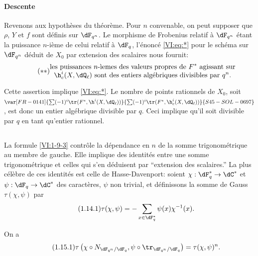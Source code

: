 \paragraph{Descente}
Revenons aux hypothèses du théorème. Pour $n$ convenable, on peut 
supposer que $\rho$, $Y$ et $f$ sont définis sur $\dF_{q^n}$. Le morphisme de 
Frobenius relatif à $\dF_{q^n}$ étant la puissance $n$-ième de celui 
relatif à $\dF_q$, l'énoncé \eqref{VI:eq:*} pour le schéma sur 
$\dF_{q^n}$ déduit de $X_0$ par extension des scalaires nous fournit: 
\begin{equation*}\tag{$**$}\label{VI:eq:**}
  \substack{\displaystyle\text{les puissances $n$-\`iemes des valeurs propres de $F^\ast$ agissant sur} \\ \displaystyle\text{$\h_c^i(X,\dQ_\ell)$ sont des entiers algébriques divisibles par $q^n$.}}
\end{equation*}

Cette assertion implique \eqref{VI:eq:*}. Le nombre de points rationnels de 
$X_0$, soit $\var[FR-0141]{\sum (-1)^i \tr(F^\ast,\h^i(X,\dQ_\ell))}{\sum (-1)^i \tr(F^\ast,\h_c^i(X,\dQ_\ell))}{S45-SOL-0697}$, est donc un entier 
algébrique divisible par $q$. Ceci implique qu'il soit divisible par $q$ en 
tant qu'entier rationnel. 






\subsection{}\label{VI:1-14}

La formule \ref{VI:1-9-3} contrôle la dépendance en $n$ de la somme 
trigonométrique au membre de gauche. Elle implique des identités entre une 
somme trigonométrique et celles qui s'en déduisent par ``extension des 
scalaires.'' La plus célèbre de ces identités est celle de 
Hasse-Davenport: soient $\chi:\dF_q^\ast \to \dC^\ast$ et 
$\psi:\dF_q\to \dC^\ast$ des caractères, $\psi$ non trivial, et 
définissons la somme de Gauss $\tau(\chi,\psi)$ par 
\begin{equation*}\tag{1.14.1}\label{VI:eq:1-14-1}
  \tau(\chi,\psi) = - \sum_{x\in \dF_q^\ast} \psi(x) \chi^{-1}(x) \text{.}
\end{equation*}





\begin{theorem_}\label{VI:1-15}
On a 
\begin{equation*}\tag{1.15.1}\label{VI:eq:1-15-1}
  \tau\left(\chi\circ N_{\dF_{q^n}/\dF_q},\psi\circ \tr_{\dF_{q^n}/\dF_q}\right) = \tau(\chi,\psi)^n \text{.}
\end{equation*}
\end{theorem_}

